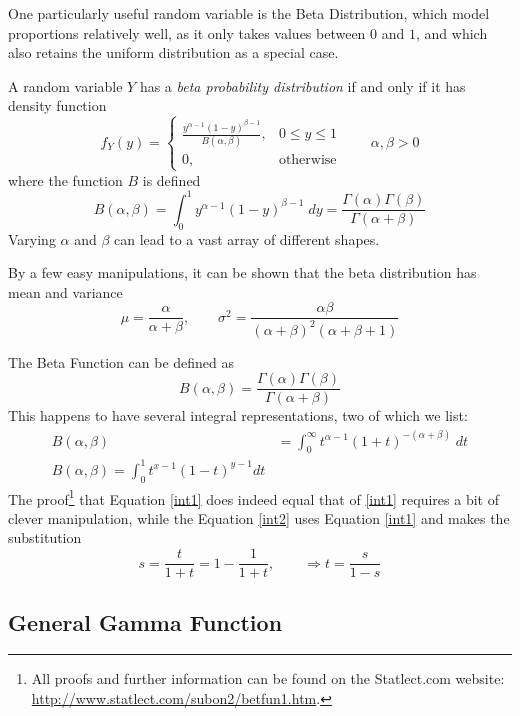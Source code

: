 \documentclass[12pt]{article}
\theoremstyle{plain}
\theoremstyle{definition}
\theoremstyle{remark}
\begin{document}
One particularly useful random variable is the Beta Distribution, which
model proportions relatively well, as it only takes values between
$0$ and $1$, and which also retains the uniform distribution as a special
case.

A random variable $Y$ has a \emph{beta probability distribution} if
and only if it has density function
\begin{equation}
   \label{pdf}
   f_Y(y) = \begin{cases} \frac{y^{\alpha -1} (1-y)^{\beta-1}}{B(\alpha,
      \beta)}, & 0\leq y \leq 1 \\
	 0, & \text{otherwise}
   \end{cases} \qquad \alpha, \beta > 0
\end{equation}
where the function $B$ is defined
   \[ B(\alpha, \beta) = \int^1_0 y^{\alpha-1}(1-y)^{\beta-1} \; dy =
      \frac{\Gamma(\alpha)\Gamma(\beta)}{\Gamma(\alpha + \beta)} \]
Varying $\alpha$ and $\beta$ can lead to a vast array of different
shapes.

By a few easy manipulations, it can be shown that the beta distribution
has mean and variance
\begin{equation}
   \label{beta}
    \mu = \frac{\alpha}{\alpha+\beta}, \qquad \sigma^2 =
      \frac{\alpha\beta}{(\alpha+\beta)^2 (\alpha+\beta+1)}
\end{equation}

The Beta Function can be defined as
\[ B(\alpha, \beta) = \frac{\Gamma(\alpha) \Gamma(\beta)}{\Gamma(\alpha
   + \beta)} \]
This happens to have several integral representations, two of which
we list:
\begin{align}
   B(\alpha, \beta) &= \int^{\infty}_0 t^{\alpha-1} (1+t)^{-(\alpha+
   \beta)} \; dt \label{int1} \\
   B(\alpha, \beta) = \int^1_0 t^{x-1} (1-t)^{y-1} dt \label{int2}
\end{align}
The proof\footnote{All proofs and further information can be found
   on the Statlect.com website:
   \url{http://www.statlect.com/subon2/betfun1.htm}. }
that Equation \ref{int1} does indeed equal that of \ref{int1}
requires a bit of clever manipulation, while the Equation \ref{int2} uses
Equation \ref{int1} and makes the substitution
   \[ s = \frac{t}{1+t} = 1-\frac{1}{1+t}, \qquad \Rightarrow
      t = \frac{s}{1-s} \]


\subsection{General Gamma Function}
\end{document}
